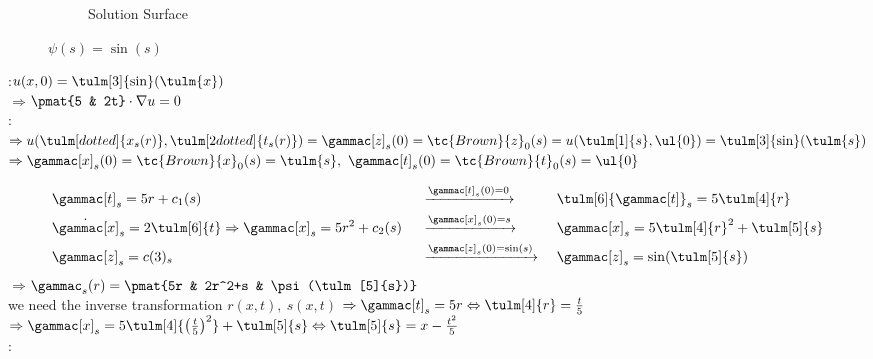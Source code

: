 \begin{notebox}[Note]
\begin{figure}[H]
\begin{subfigure}{.6\columnwidth}
                      \caption{Solution Surface}
                      \label{fig:projChar1p2}
                    \end{subfigure}
                    \caption{$\psi(s)=\sin(s)$}
                \end{figure}
\end{notebox}

\begin{notebox}[Example 3: \textnormal{$5u_t+2tu_x=0$\hfil $\dot{t}=5,\ \dot{x}=2t,\ \dot{z}=0$}]
                :\hfil $u(x, 0)=\tulm[3]{\sin}(\tulm{x})$\\
                $\Rightarrow$\hfil $\pmat{5 & 2t}\cdot\nabla u=0$\\
                :\\
                $\Rightarrow u(\tulm[dotted]{x_s(r)},\tulm[2dotted]{t_s(r)})=\gammac[z]_s(0)=\tc{Brown}{z}_0(s)=u(\tulm[1]{s},\ul{0})=\tulm[3]{\sin}(\tulm{s})$\\
                $\Rightarrow \gammac[x]_s(0)=\tc{Brown}{x}_0(s)=\tulm{s},\
                             \gammac[t]_s(0)=\tc{Brown}{t}_0(s)=\ul{0}$
\end{notebox}
\begin{notebox}[Solution 3]
                \nospacing
                \begin{alignat*}{3}
                    &\gammac[t]_s=5r+c_1(s)                  &  &\xrightarrow{\gammac[t]_s(0)=0} &   & \tulm[6]{\gammac[t]}_s=5\tulm[4]{r}\\
&\dot{\gammac[x]}_s=2\tulm[6]{t}\Rightarrow\gammac[x]_s=5r^2+c_2(s)&    &\xrightarrow{\gammac[x]_s(0)=s}  &  & \gammac[x]_s=5\tulm[4]{r}^2+\tulm[5]{s}      \\
                    &\gammac[z]_s=c(3)_s                 &\     &\xrightarrow{\gammac[z]_s(0)=\sin(s)}&\ & \gammac[z]_s=\sin(\tulm[5]{s})
                \end{alignat*}
                $\Rightarrow$\hfil$ \gammac_s(r)=\pmat{5r & 2r^2+s & \psi(\tulm[5]{s})}$\\
                \imp{Now} we need the inverse transformation $r(x,t),\ s(x,t)$
                $\Rightarrow \gammac[t]_s=5r \Leftrightarrow \tulm[4]{r}=\frac{t}{5}$\qquad
                    $\Rightarrow  \gammac[x]_s=5\tulm[4]{\left(\frac{t}{5}\right)^2}+\tulm[5]{s} \Leftrightarrow
                    \tulm[5]{s}=x-\frac{t^2}{5}$\\
                : 
\end{notebox}
